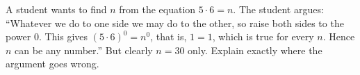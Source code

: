 A student wants to find $n$ from the equation $5\cdot6=n$. The student argues: ``Whatever we do to one side we may do to the other, so raise both sides to the power $0$. This gives $(5\cdot6)^0=n^0$, that is, $1=1$, which is true for every $n$. Hence $n$ can be any number.'' But clearly $n=30$ only. Explain exactly where the argument goes wrong.
